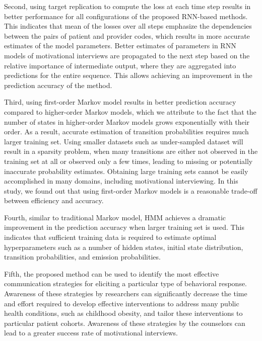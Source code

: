 \documentclass{amia_summit_2018}
\begin{document}
Second, using target replication to compute the loss at each time step results in better performance for all configurations of the proposed RNN-based methods. This indicates that mean of the losses
over all steps emphasize the dependencies between the pairs of patient and provider codes, which results in more accurate estimates of the model parameters. Better estimates of parameters in RNN
models of motivational interviews are propagated to the next step based on the relative importance of intermediate output, where they are aggregated into predictions for the entire sequence. This
allows achieving an improvement in the prediction accuracy of the method.

Third, using first-order Markov model results in better prediction accuracy compared to higher-order Markov models, which we attribute to the fact that the number of states in higher-order
Markov models grows exponentially with their order. As a result, accurate estimation of transition probabilities requires much larger training set. Using smaller datasets such as under-sampled dataset
will result in a sparsity problem, when many transitions are either not observed in the training set at all or observed only a few times, leading to missing or potentially inaccurate probability
estimates. Obtaining large training sets cannot be easily accomplished in many domains, including motivational interviewing. In this study, we found out that using first-order Markov models is a
reasonable trade-off between efficiency and accuracy.

Fourth, similar to traditional Markov model, HMM achieves a dramatic improvement in the prediction accuracy when larger training set is used. This indicates that sufficient training data is required
to estimate optimal hyperparameters such as a number of hidden states, initial state distribution, transition probabilities, and emission probabilities.   
 
Fifth, the proposed method can be used to identify the most effective communication strategies for eliciting a particular type of behavioral response. Awareness of these strategies by researchers can significantly decrease the time and effort required to develop effective interventions to address many public health conditions, such as childhood obesity, and tailor these interventions to particular patient cohorts. Awareness of these strategies by the counselors can lead to a greater success rate of motivational interviews.     
 
\end{document}
